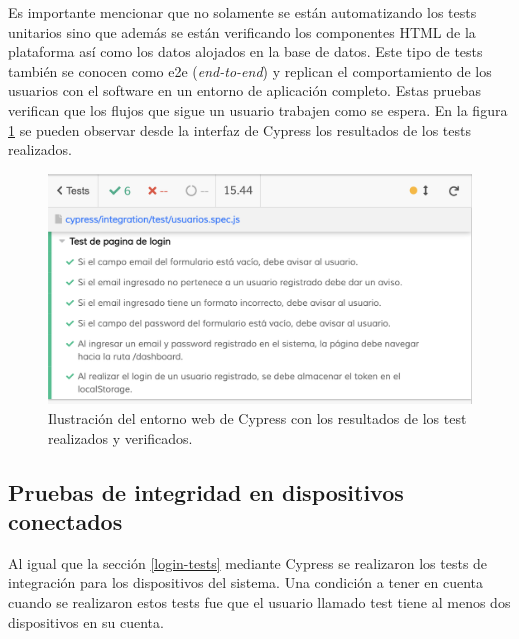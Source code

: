 \pagebreak

Es importante mencionar que no solamente se están automatizando los tests unitarios sino que además se están verificando los componentes HTML de la plataforma así como los datos alojados en la base de datos. Este tipo de tests también se conocen como e2e (\textit{end-to-end}) y replican el comportamiento de los usuarios con el software en un entorno de aplicación completo. Estas pruebas verifican que los flujos que sigue un usuario trabajen como se espera. En la figura \ref{fig:cypress-test-login} se pueden observar desde la interfaz de Cypress los resultados de los tests realizados.

\begin{figure}[htpb]
	\centering
	\includegraphics[scale=.30]{./Figures/test-login-cypress.png}
	\caption[Resultado de test de login de la plataforma web]{Ilustración del entorno web de Cypress con los resultados de los test realizados y verificados.}
	\label{fig:cypress-test-login}
\end{figure}

\pagebreak


\subsection{Pruebas de integridad en dispositivos conectados}
\label{devs-cypress}


Al igual que la sección \ref{login-tests} mediante Cypress se realizaron los tests de integración para los dispositivos del sistema. Una condición a tener en cuenta cuando se realizaron estos tests fue que el usuario llamado test tiene al menos dos dispositivos en su cuenta.  

